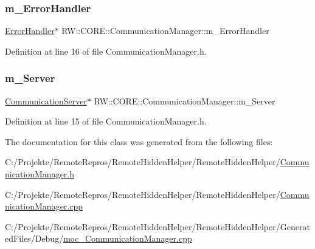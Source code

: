 \subsubsection{\texorpdfstring{m\+\_\+\+Error\+Handler}{m\_ErrorHandler}}
{\footnotesize\ttfamily \hyperlink{class_r_w_1_1_c_o_r_e_1_1_error_handler}{Error\+Handler}$\ast$ R\+W\+::\+C\+O\+R\+E\+::\+Communication\+Manager\+::m\+\_\+\+Error\+Handler\hspace{0.3cm}{\ttfamily [private]}}



Definition at line 16 of file Communication\+Manager.\+h.

\hypertarget{class_r_w_1_1_c_o_r_e_1_1_communication_manager_ae16c353628da4af164f91c9dd38cefac}{}\label{class_r_w_1_1_c_o_r_e_1_1_communication_manager_ae16c353628da4af164f91c9dd38cefac} 
\subsubsection{\texorpdfstring{m\+\_\+\+Server}{m\_Server}}
{\footnotesize\ttfamily \hyperlink{class_r_w_1_1_c_o_r_e_1_1_communication_server}{Communication\+Server}$\ast$ R\+W\+::\+C\+O\+R\+E\+::\+Communication\+Manager\+::m\+\_\+\+Server\hspace{0.3cm}{\ttfamily [private]}}



Definition at line 15 of file Communication\+Manager.\+h.



The documentation for this class was generated from the following files\+:\begin{DoxyCompactItemize}
\item 
C\+:/\+Projekte/\+Remote\+Repros/\+Remote\+Hidden\+Helper/\+Remote\+Hidden\+Helper/\hyperlink{_communication_manager_8h}{Communication\+Manager.\+h}\item 
C\+:/\+Projekte/\+Remote\+Repros/\+Remote\+Hidden\+Helper/\+Remote\+Hidden\+Helper/\hyperlink{_communication_manager_8cpp}{Communication\+Manager.\+cpp}\item 
C\+:/\+Projekte/\+Remote\+Repros/\+Remote\+Hidden\+Helper/\+Remote\+Hidden\+Helper/\+Generated\+Files/\+Debug/\hyperlink{_debug_2moc___communication_manager_8cpp}{moc\+\_\+\+Communication\+Manager.\+cpp}\end{DoxyCompactItemize}
